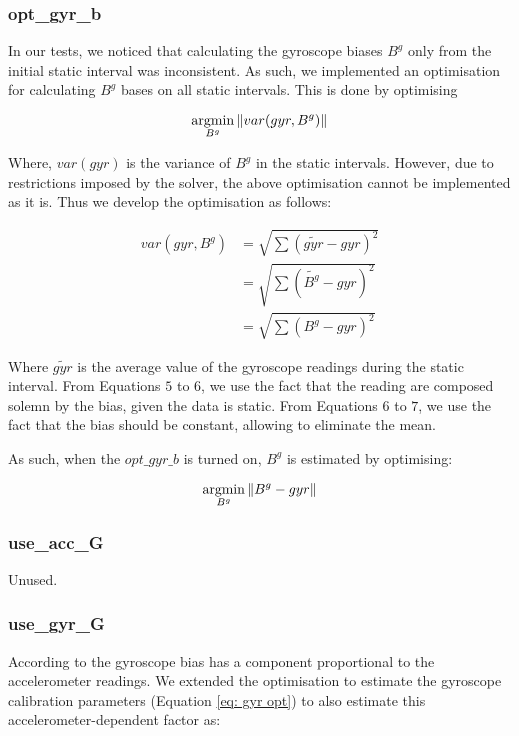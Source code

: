 \subsubsection*{opt\_gyr\_b}
In our tests, we noticed that calculating the gyroscope biases $B^g$ only from the initial static interval was inconsistent.
%
As such, we implemented an optimisation for calculating $B^g$ bases on all static intervals.
%
This is done by optimising 

\begin{equation}
	\operatorname*{argmin}_{B^g} \left\|var(gyr, B^g)\right\|
\end{equation}

Where, $var(gyr)$ is the variance of $B^g$ in the static intervals.
%
However, due to restrictions imposed by the solver, the above optimisation cannot be implemented as it is.
%
Thus we develop the optimisation as follows:

\begin{eqnarray}
	var(gyr, B^g) & = \sqrt{\sum(\tilde{gyr}-gyr)^2} \\
		& = \sqrt{\sum(\tilde{B^g} - gyr )^2} \\
		& = \sqrt{\sum(B^g - gyr)^2}
\end{eqnarray}

Where $\tilde{gyr}$ is the average value of the gyroscope readings during the static interval.
%
From Equations $5$ to $6$, we use the fact that the reading are composed solemn by the bias, given the data is static.
%
From Equations $6$ to $7$, we use the fact that the bias should be constant, allowing to eliminate the mean.

As such, when the \texttt{$opt\_gyr\_b$} is turned on, $B^g$ is estimated by optimising:

\begin{equation}
	\operatorname*{argmin}_{B^g} \left\|B^g-gyr\right\|
\end{equation}

\subsubsection*{use\_acc\_G}

Unused.

\subsubsection*{use\_gyr\_G}
According to \cite{altinoz2018determining} the gyroscope bias has a component proportional to the accelerometer readings.
%
We extended the optimisation to estimate the gyroscope calibration parameters (Equation \ref{eq: gyr opt}) to also estimate this accelerometer-dependent factor as:

